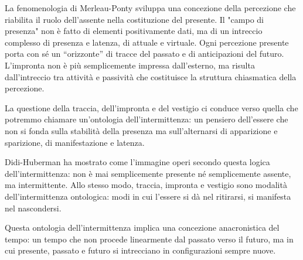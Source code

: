 \documentclass{../../lib/gs}
\begin{document}
La fenomenologia di Merleau-Ponty \cite{merleau-ponty1945} sviluppa una concezione della percezione che riabilita il ruolo dell'assente nella costituzione del presente. Il "campo di presenza" non è fatto di elementi positivamente dati, ma di un intreccio complesso di presenza e latenza, di attuale e virtuale. Ogni percezione presente porta con sé un “orizzonte” di tracce del passato e di anticipazioni del futuro. L'impronta non è più semplicemente impressa dall'esterno, ma risulta dall'intreccio tra attività e passività che costituisce la struttura chiasmatica della percezione.

%

La questione della traccia, dell'impronta e del vestigio ci conduce verso quella che potremmo chiamare un'ontologia dell'intermittenza: un pensiero dell'essere che non si fonda sulla stabilità della presenza ma sull'alternarsi di apparizione e sparizione, di manifestazione e latenza.

Didi-Huberman \cite{didi-huberman2002} ha mostrato come l'immagine operi secondo questa logica dell'intermittenza: non è mai semplicemente presente né semplicemente assente, ma intermittente. Allo stesso modo, traccia, impronta e vestigio sono modalità dell'intermittenza ontologica: modi in cui l'essere si dà nel ritirarsi, si manifesta nel nascondersi.


Questa ontologia dell'intermittenza implica una concezione anacronistica del tempo: un tempo che non procede linearmente dal passato verso il futuro, ma in cui presente, passato e futuro si intrecciano in configurazioni sempre nuove.

\end{document}
